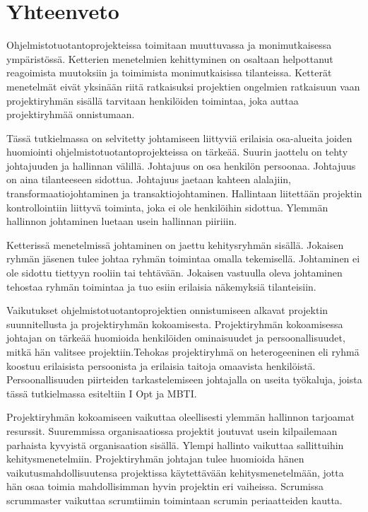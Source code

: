\documentclass[finnish]{tktltiki2}
\theoremstyle{definition}
\theoremstyle{remark}
\begin{document}
  



\section{Yhteenveto}

Ohjelmistotuotantoprojekteissa toimitaan muuttuvassa ja monimutkaisessa ympäristössä. Ketterien menetelmien kehittyminen on osaltaan helpottanut reagoimista muutoksiin ja toimimista monimutkaisissa tilanteissa. Ketterät menetelmät eivät yksinään riitä ratkaisuksi projektien ongelmien ratkaisuun vaan projektiryhmän sisällä tarvitaan henkilöiden toimintaa, joka auttaa projektiryhmää onnistumaan.

Tässä tutkielmassa on selvitetty johtamiseen liittyviä erilaisia osa-alueita joiden huomiointi ohjelmistotuotantoprojekteissa on tärkeää. Suurin jaottelu on tehty johtajuuden ja hallinnan välillä. Johtajuus on osa henkilön persoonaa. Johtajuus on aina tilanteeseen sidottua. Johtajuus jaetaan kahteen alalajiin, transformaatiojohtaminen ja transaktiojohtaminen. Hallintaan liitettään projektin kontrollointiin liittyvä toiminta, joka ei ole henkilöihin sidottua. Ylemmän hallinnon johtaminen luetaan usein hallinnan piiriiin.

Ketterissä menetelmissä johtaminen on jaettu kehitysryhmän sisällä. Jokaisen ryhmän jäsenen tulee johtaa ryhmän toimintaa omalla tekemisellä. Johtaminen ei ole sidottu tiettyyn rooliin tai tehtävään. Jokaisen vastuulla oleva johtaminen tehostaa ryhmän toimintaa ja tuo esiin erilaisia näkemyksiä tilanteisiin.

Vaikutukset ohjelmistotuotantoprojektien onnistumiseen alkavat projektin suunnitellusta ja projektiryhmän kokoamisesta. Projektiryhmän kokoamisessa johtajan on tärkeää huomioida henkilöiden ominaisuudet ja persoonallisuudet, mitkä hän valitsee projektiin.Tehokas projektiryhmä on heterogeeninen eli ryhmä koostuu erilaisista persoonista ja erilaisia taitoja omaavista henkilöistä. Persoonallisuuden piirteiden tarkastelemiseen johtajalla on useita työkaluja, joista tässä tutkielmassa esiteltiin I Opt ja MBTI.

Projektiryhmän kokoamiseen vaikuttaa oleellisesti ylemmän hallinnon tarjoamat resurssit. Suuremmissa organisaatiossa projektit joutuvat usein kilpailemaan parhaista kyvyistä organisaation sisällä. Ylempi hallinto vaikuttaa sallittuihin kehitysmenetelmiin. Projektiryhmän johtajan tulee huomioida hänen vaikutusmahdollisuutensa projektissa käytettävään kehitysmenetelmään, jotta hän osaa toimia mahdollisimman hyvin projektin eri vaiheissa. Scrumissa scrummaster vaikuttaa scrumtiimin toimintaan scrumin periaatteiden kautta.
\end{document}
